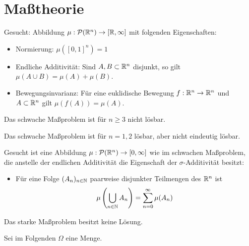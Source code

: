 \documentclass{cheat-sheet}
\newcommand{\PS}{\mathcal{P}} %
\begin{document}

\section{Maßtheorie}

\begin{prob}
  Gesucht: Abbildung $\mu : \PS(\R^n) \to [\R, \infty]$ mit folgenden Eigenschaften:
  \begin{itemize}
    \item Normierung: $\mu([0, 1]^n) = 1$
    \item Endliche Additivität: Sind $A, B \subset \mathbb{R}^n$ disjunkt, so gilt $\mu(A \cup B) = \mu(A) + \mu(B)$.
    \item Bewegungsinvarianz: Für eine euklidische Bewegung $f : \mathbb{R}^n \to \mathbb{R}^n$ und $A \subset \mathbb{R}^n$ gilt $\mu(f(A)) = \mu(A)$.
  \end{itemize}
\end{prob}

\begin{satz}[Hausdorff]
  Das schwache Maßproblem ist für $n \geq 3$ nicht lösbar.
\end{satz}

\begin{satz}[Banach]
  Das schwache Maßproblem ist für $n = 1, 2$ lösbar, aber nicht eindeutig lösbar.
\end{satz}

\begin{prob}
  Gesucht ist eine Abbildung $\mu : \PS(\R^n) \to [0, \infty]$ wie im schwachen Maßproblem, die anstelle der endlichen Additivität die Eigenschaft der $\sigma$-Additivität besitzt:
  \begin{itemize}
    \item Für eine Folge $(A_n)_{n \in \mathbb{N}}$ paarweise disjunkter Teilmengen des $\mathbb{R}^n$ ist
      \[ \mu\left(\bigcup_{n \in \mathbb{N}} A_n\right) = \sum_{n=0}^\infty \mu(A_n) \]
  \end{itemize}
\end{prob}

\begin{satz}
  Das starke Maßproblem besitzt keine Lösung.
\end{satz}

\begin{nota}
  Sei im Folgenden $\Omega$ eine Menge.
\end{nota}
\end{document}
